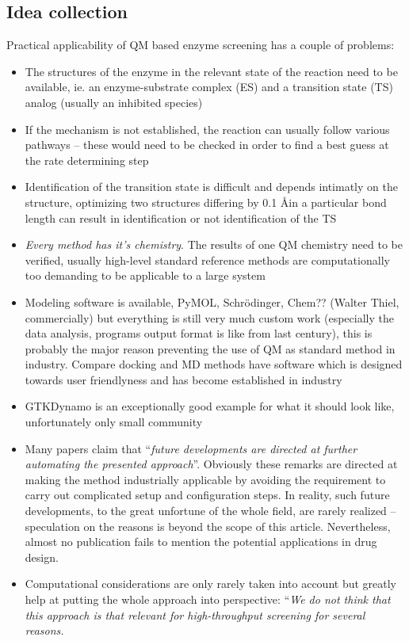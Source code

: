 \subsection{Idea collection}
Practical applicability of QM based enzyme screening has a couple of problems:
\begin{itemize}
\item The structures of the enzyme in the relevant state of the reaction need to be available, ie. an enzyme-substrate complex (ES) and a transition state (TS) analog (usually an inhibited species)
\item If the mechanism is not established, the reaction can usually follow various pathways -- these would need to be checked in order to find a best guess at the rate determining step
\item Identification of the transition state is difficult and depends intimatly on the structure, optimizing two structures differing by 0.1 \AA in a particular bond length can result in identification or not identification of the TS
\item \textit{Every method has it's chemistry}. The results of one QM chemistry need to be verified, usually high-level standard reference methods are computationally too demanding to be applicable to a large system
\item Modeling software is available, PyMOL, Schr\"odinger, Chem?? (Walter Thiel, commercially) but everything is still very much custom work (especially the data analysis, programs output format is like from last century), this is probably the major reason preventing the use of QM as standard method in industry. Compare docking and MD methods have software which is designed towards user friendlyness and has become established in industry
\item GTKDynamo is an exceptionally good example for what it should look like, unfortunately only small community
\item Many papers claim that ``\textit{future developments are directed at further automating the presented approach}''.
Obviously these remarks are directed at making the method industrially applicable by avoiding the requirement to carry out complicated setup and configuration steps\cite{rathore2013advances}.
In reality, such future developments, to the great unfortune of the whole field, are rarely realized -- speculation on the reasons is beyond the scope of this article.
Nevertheless, almost no publication fails to mention the potential applications in drug design.
\item Computational considerations are only rarely taken into account but greatly help at putting the whole approach into perspective: ``\textit{We do not think that this approach is that relevant for high-throughput screening for several reasons.
}
\end{itemize}
